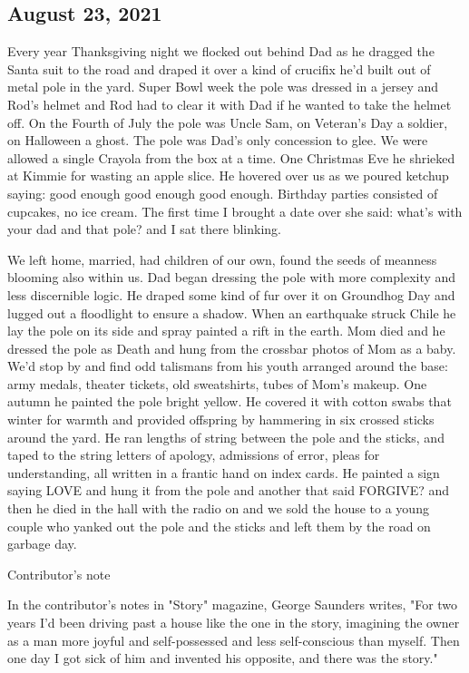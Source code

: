 \documentclass{scrreprt} %
\begin{document}
\subsection{August 23, 2021}

\begin{example}

Every year Thanksgiving night we flocked out behind Dad as he dragged the Santa suit to the road and draped it over a kind of crucifix he'd built out of metal pole in the yard. Super Bowl week the pole was dressed in a jersey and Rod's helmet and Rod had to clear it with Dad if he wanted to take the helmet off. On the Fourth of July the pole was Uncle Sam, on Veteran’s Day a soldier,  on Halloween a ghost. The pole was Dad's only concession to glee. We were allowed a single Crayola from the box at a time. One Christmas Eve he shrieked at Kimmie for wasting an apple slice. He hovered over us as we poured ketchup saying: good enough good enough good enough. Birthday parties consisted of cupcakes, no ice cream. The first time I brought a date over she said: what's with your dad and that pole? and I sat there blinking.

We left home, married,  had children of our own, found the seeds of meanness blooming also within us. Dad began dressing the pole with more complexity and less discernible logic. He draped some kind of fur over it on Groundhog Day and lugged out a floodlight to ensure a shadow. When an earthquake struck Chile he lay the pole on its side and spray painted a rift in the earth. Mom died and he dressed the pole as Death and hung from the crossbar photos of Mom as a baby. We'd stop by and find odd talismans from his youth arranged around the base: army medals, theater tickets, old sweatshirts, tubes of Mom's makeup. One autumn he painted the pole bright yellow. He covered it with cotton swabs that winter for warmth and provided offspring by hammering in six crossed sticks around the yard. He ran lengths of string between the pole and the sticks, and taped to the string letters of apology, admissions of error, pleas for understanding, all written in a frantic hand on index cards. He painted a sign saying LOVE and hung it from the pole and another that said FORGIVE? and then he died in the hall with the radio on and we sold the house to a young couple who yanked out the pole and the sticks and left them by the road on garbage day.

\end{example}

Contributor's note

In the contributor's notes in "Story" magazine, George Saunders writes, "For two years I'd been driving past a house like the one in the story, imagining the owner as a man more joyful and self-possessed and less self-conscious than myself. Then one day I got sick of him and invented his opposite, and there was the story."
\end{document}
